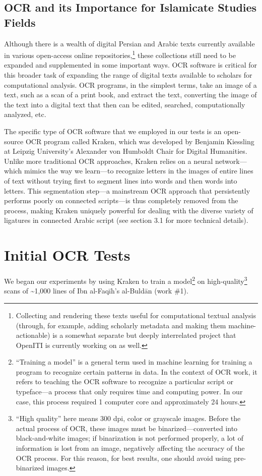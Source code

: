 \subsection{OCR and its Importance for Islamicate Studies Fields}

Although there is a wealth of digital Persian and Arabic texts currently
available in various open-access online repositories,\footnote{Collecting and
rendering these texts useful for computational textual analysis (through, for
example, adding scholarly metadata and making them machine-actionable) is a
somewhat separate but deeply interrelated project that OpenITI is currently
working on as well.} these collections still need to be expanded and
supplemented in some important ways. OCR software is critical for this broader
task of expanding the range of digital texts available to scholars for
computational analysis. OCR programs, in the simplest terms, take an image of a
text, such as a scan of a print book, and extract the text, converting the
image of the text into a digital text that then can be edited, searched,
computationally analyzed, etc.   

The specific type of OCR software that we employed in our tests is an
open-source OCR program called Kraken, which was developed by Benjamin
Kiessling at Leipzig University’s Alexander von Humboldt Chair for Digital
Humanities. Unlike more traditional OCR approaches, Kraken relies on a neural
network—which mimics the way we learn—to recognize letters in the images of
entire lines of text without trying first to segment lines into words and then
words into letters. This segmentation step—a mainstream OCR approach that
persistently performs poorly on connected scripts—is thus completely removed
from the process, making Kraken uniquely powerful for dealing with the diverse
variety of ligatures in connected Arabic script (see section 3.1 for more
technical details).

\section{Initial OCR Tests}

We began our experiments by using Kraken to train a model\footnote{“Training a
model” is a general term used in machine learning for training a program to
recognize certain patterns in data. In the context of OCR work, it refers to
teaching the OCR software to recognize a particular script or typeface—a
process that only requires time and computing power. In our case, this process
required 1 computer core and approximately 24 hours.} on
high-quality\footnote{“High quality” here means 300 dpi, color or grayscale
images. Before the actual process of OCR, these images must be
binarized—converted into black-and-white images; if binarization is not
performed properly, a lot of information is lost from an image, negatively
affecting the accuracy of the OCR process. For this reason, for best results,
one should avoid using pre-binarized images.} scans of \textasciitilde1,000
lines of Ibn al-Faqīh’s al-Buldān (work \#1).

